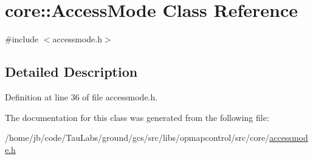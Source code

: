 \hypertarget{classcore_1_1_access_mode}{\section{core\-:\-:\-Access\-Mode \-Class \-Reference}
\label{classcore_1_1_access_mode}
}


{\ttfamily \#include $<$accessmode.\-h$>$}



\subsection{\-Detailed \-Description}


\-Definition at line 36 of file accessmode.\-h.



\-The documentation for this class was generated from the following file\-:\begin{DoxyCompactItemize}
\item 
/home/jb/code/\-Tau\-Labs/ground/gcs/src/libs/opmapcontrol/src/core/\hyperlink{accessmode_8h}{accessmode.\-h}\end{DoxyCompactItemize}
